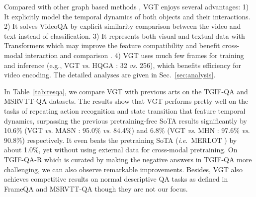 \documentclass[runningheads]{llncs}
\newcommand{\ie}{\textit{i}.\textit{e}.}
\newcommand{\eg}{e.g.}
\newcommand{\vs}{\textit{vs}. }
\begin{document}
Compared with other graph based methods \cite{cherian2022,jiang2020reasoning,xiao2021video}, VGT enjoys several advantages: 1) It explicitly model the temporal dynamics of both objects and their interactions. 2) It solves VideoQA by explicit similarity comparison between the video and text instead of classification. 3) It represents both visual and textual data with Transformers which may improve the feature compatibility and benefit cross-modal interaction and comparison \cite{devlin2018bert}. 4) VGT uses much few frames for training and inference (\eg, VGT \vs HQGA \cite{xiao2021video}: 32 \vs 256), which benefits efficiency for video encoding. The detailed analyses are given in Sec.~\ref{sec:analysis}.

In Table~\ref{tab:resqa}, we compare VGT with previous arts on the TGIF-QA and MSRVTT-QA datasets. The results show that VGT performs pretty well on the tasks of repeating action recognition and state transition that feature temporal dynamics, surpassing the previous pretraining-free SoTA results significantly by 10.6\% (VGT \vs MASN \cite{seo2021attend}: 95.0\% \vs 84.4\%) and 6.8\% (VGT \vs MHN \cite{peng2022multilevel}: 97.6\% \vs 90.8\%) respectively. It even beats the pretraining SoTA (\ie~MERLOT \cite{zellers2021merlot}) by about 1.0\%, yet without using external data for cross-modal pretraining. On TGIF-QA-R \cite{peng2021progressive} which is curated by making the negative answers in TGIF-QA more challenging, we can also observe remarkable improvements. Besides, VGT also achieves competitive results on normal descriptive QA tasks as defined in FrameQA and MSRVTT-QA though they are not our focus. 
\end{document}
